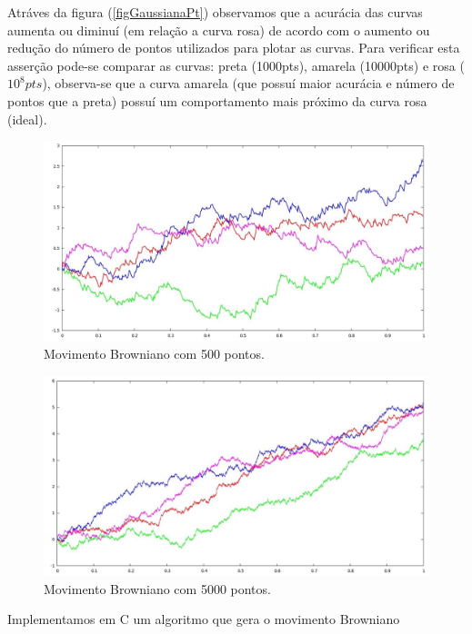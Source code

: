 Atráves da figura (\ref{figGaussianaPt}) observamos que a acurácia das curvas aumenta ou diminuí (em relação a curva rosa) de acordo com o aumento ou redução do número de pontos utilizados para plotar as curvas. Para verificar esta asserção pode-se comparar as curvas: preta (1000pts), amarela (10000pts) e rosa ($10^{8}pts$), observa-se que a curva amarela (que possuí maior acurácia e número de pontos que a preta) possuí um comportamento mais próximo da curva rosa (ideal).	
\begin{figure}[!htb]
\centering
\begin{minipage}[b]{0.9\linewidth}
\includegraphics[width=\linewidth]{./img/Distribuicoes/Mb500pts.jpg}
\caption{Movimento Browniano com 500 pontos.}
\label{figMovBrown500}
\end{minipage} \hfill
\end{figure}

\begin{figure}[!htb]
\centering
\begin{minipage}[b]{0.9\linewidth}
\includegraphics[width=\linewidth]{./img/Distribuicoes/MB5000ptos.jpg}
\caption{Movimento Browniano com 5000 pontos.}
\label{figMovBrown5000}
\end{minipage} \hfill
\end{figure}
Implementamos em C um algoritmo que gera o movimento Browniano %